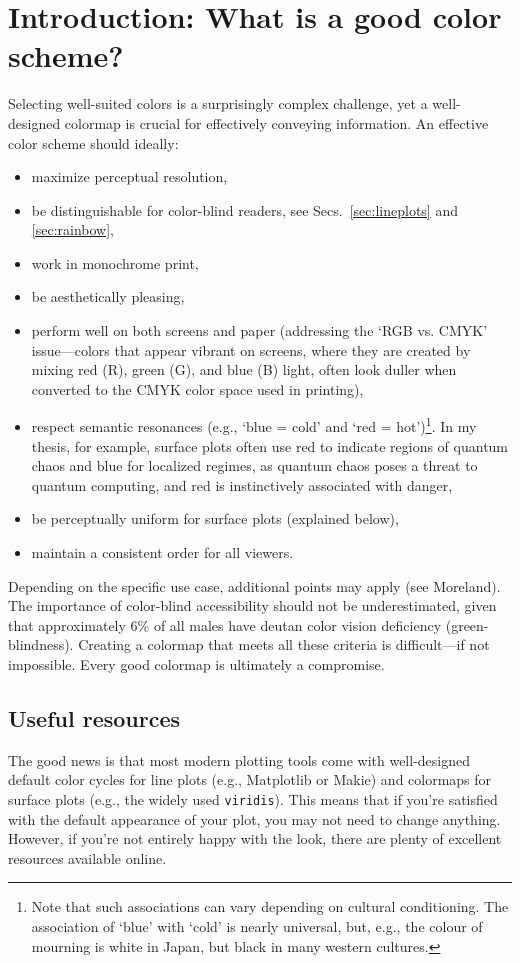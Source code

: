 \section{Introduction: What is a good color scheme?}
Selecting well-suited colors is a surprisingly complex challenge, yet a well-designed colormap is crucial for effectively conveying information. An effective color scheme should ideally:
\begin{itemize}
	\item maximize perceptual resolution,
    \item be distinguishable for color-blind readers, see Secs.~\ref{sec:lineplots} and \ref{sec:rainbow},
    \item work in monochrome print,
    \item be aesthetically pleasing,
    \item perform well on both screens and paper (addressing the `RGB vs. CMYK' issue---colors that appear vibrant on screens, where they are created by mixing red (R), green (G), and blue (B) light, often look duller when converted to the CMYK color space used in printing),
    \item respect semantic resonances\cite{linSelectingSemanticallyResonantColors2013} (e.g., `blue = cold' and `red = hot')\footnote{Note that such associations can vary depending on cultural conditioning. The association of `blue' with `cold' is nearly universal, but, e.g., the colour of mourning is white in Japan, but black in many western cultures.}. In my thesis, for example, surface plots often use red to indicate regions of quantum chaos and blue for localized regimes, as quantum chaos poses a threat to quantum computing, and red is instinctively associated with danger,
    \item be perceptually uniform for surface plots (explained below),
    \item maintain a consistent order for all viewers.
\end{itemize}

Depending on the specific use case, additional points may apply (see Moreland). The importance of color-blind accessibility should not be underestimated, given that approximately 6\% of all males have deutan color vision deficiency (green-blindness).
Creating a colormap that meets all these criteria is difficult—if not impossible. Every good colormap is ultimately a compromise.

\subsection{Useful resources}
The good news is that most modern plotting tools come with well-designed default color cycles for line plots (e.g., Matplotlib or Makie) and colormaps for surface plots (e.g., the widely used \verb|viridis|). This means that if you're satisfied with the default appearance of your plot, you may not need to change anything. However, if you're not entirely happy with the look, there are plenty of excellent resources available online.

